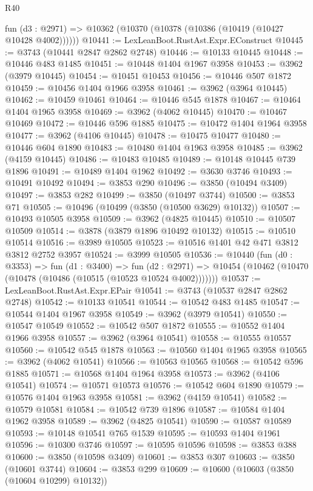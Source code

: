 \begin{lexlean}{R40}
\begin{coremodule}
    fun (d3 : @2971) => @10362 (@10370 (@10378 (@10386 (@10419 (@10427 @10428 @4002))))))
@10441 := LexLeanBoot.RustAst.Expr.EConstruct
@10445 := @3743 (@10441 @2847 @2862 @2748)
@10446 := @10133 @10445
@10448 := @10446 @483 @1485
@10451 := @10448 @1404 @1967 @3958
@10453 := @3962 (@3979 @10445)
@10454 := @10451 @10453
@10456 := @10446 @507 @1872
@10459 := @10456 @1404 @1966 @3958
@10461 := @3962 (@3964 @10445)
@10462 := @10459 @10461
@10464 := @10446 @545 @1878
@10467 := @10464 @1404 @1965 @3958
@10469 := @3962 (@4062 @10445)
@10470 := @10467 @10469
@10472 := @10446 @596 @1885
@10475 := @10472 @1404 @1964 @3958
@10477 := @3962 (@4106 @10445)
@10478 := @10475 @10477
@10480 := @10446 @604 @1890
@10483 := @10480 @1404 @1963 @3958
@10485 := @3962 (@4159 @10445)
@10486 := @10483 @10485
@10489 := @10148 @10445 @739 @1896
@10491 := @10489 @1404 @1962
@10492 := @3630 @3746
@10493 := @10491 @10492
@10494 := @3853 @290
@10496 := @3850 (@10494 @3409)
@10497 := @3853 @282
@10499 := @3850 (@10497 @3744)
@10500 := @3853 @71
@10505 := @10496 (@10499 (@3850 (@10500 @3629) @10132))
@10507 := @10493 @10505 @3958
@10509 := @3962 (@4825 @10445)
@10510 := @10507 @10509
@10514 := @3878 (@3879 @1896 @10492 @10132)
@10515 := @10510 @10514
@10516 := @3989 @10505
@10523 := @10516 @1401 @42 @471 @3812 @3812 @2752 @3957
@10524 := @3999 @10505
@10536 := @10440
    (fun (d0 : @3353) =>
    fun (d1 : @3400) =>
    fun (d2 : @2971) => @10454 (@10462 (@10470 (@10478 (@10486 (@10515 (@10523 @10524 @4002)))))))
@10537 := LexLeanBoot.RustAst.Expr.EPair
@10541 := @3743 (@10537 @2847 @2862 @2748)
@10542 := @10133 @10541
@10544 := @10542 @483 @1485
@10547 := @10544 @1404 @1967 @3958
@10549 := @3962 (@3979 @10541)
@10550 := @10547 @10549
@10552 := @10542 @507 @1872
@10555 := @10552 @1404 @1966 @3958
@10557 := @3962 (@3964 @10541)
@10558 := @10555 @10557
@10560 := @10542 @545 @1878
@10563 := @10560 @1404 @1965 @3958
@10565 := @3962 (@4062 @10541)
@10566 := @10563 @10565
@10568 := @10542 @596 @1885
@10571 := @10568 @1404 @1964 @3958
@10573 := @3962 (@4106 @10541)
@10574 := @10571 @10573
@10576 := @10542 @604 @1890
@10579 := @10576 @1404 @1963 @3958
@10581 := @3962 (@4159 @10541)
@10582 := @10579 @10581
@10584 := @10542 @739 @1896
@10587 := @10584 @1404 @1962 @3958
@10589 := @3962 (@4825 @10541)
@10590 := @10587 @10589
@10593 := @10148 @10541 @765 @1539
@10595 := @10593 @1404 @1961
@10596 := @10300 @3746
@10597 := @10595 @10596
@10598 := @3853 @388
@10600 := @3850 (@10598 @3409)
@10601 := @3853 @307
@10603 := @3850 (@10601 @3744)
@10604 := @3853 @299
@10609 := @10600 (@10603 (@3850 (@10604 @10299) @10132))

\end{coremodule}
\end{lexlean}

